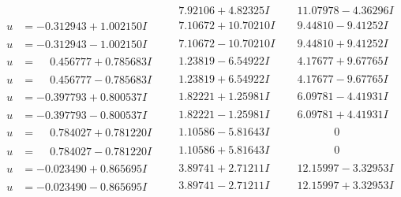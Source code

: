 \documentclass[1p]{elsarticle_modified}
\theoremstyle{definition}
\begin{document}
$$\begin{array}{c|c|c}
 & \phantom{-}7.92106 + 4.82325 I & \phantom{-}11.07978 - 4.36296 I \\ \hline\begin{aligned}
u &= -0.312943 + 1.002150 I\end{aligned}
 & \phantom{-}7.10672 + 10.70210 I & \phantom{-}9.44810 - 9.41252 I \\ \hline\begin{aligned}
u &= -0.312943 - 1.002150 I\end{aligned}
 & \phantom{-}7.10672 - 10.70210 I & \phantom{-}9.44810 + 9.41252 I \\ \hline\begin{aligned}
u &= \phantom{-}0.456777 + 0.785683 I\end{aligned}
 & \phantom{-}1.23819 - 6.54922 I & \phantom{-}4.17677 + 9.67765 I \\ \hline\begin{aligned}
u &= \phantom{-}0.456777 - 0.785683 I\end{aligned}
 & \phantom{-}1.23819 + 6.54922 I & \phantom{-}4.17677 - 9.67765 I \\ \hline\begin{aligned}
u &= -0.397793 + 0.800537 I\end{aligned}
 & \phantom{-}1.82221 + 1.25981 I & \phantom{-}6.09781 - 4.41931 I \\ \hline\begin{aligned}
u &= -0.397793 - 0.800537 I\end{aligned}
 & \phantom{-}1.82221 - 1.25981 I & \phantom{-}6.09781 + 4.41931 I \\ \hline\begin{aligned}
u &= \phantom{-}0.784027 + 0.781220 I\end{aligned}
 & \phantom{-}1.10586 - 5.81643 I & \phantom{-0.000000 } 0 \\ \hline\begin{aligned}
u &= \phantom{-}0.784027 - 0.781220 I\end{aligned}
 & \phantom{-}1.10586 + 5.81643 I & \phantom{-0.000000 } 0 \\ \hline\begin{aligned}
u &= -0.023490 + 0.865695 I\end{aligned}
 & \phantom{-}3.89741 + 2.71211 I & \phantom{-}12.15997 - 3.32953 I \\ \hline\begin{aligned}
u &= -0.023490 - 0.865695 I\end{aligned}
 & \phantom{-}3.89741 - 2.71211 I & \phantom{-}12.15997 + 3.32953 I \\ \hline\begin{aligned}

\end{aligned}
\end{array}$$
\end{document}
